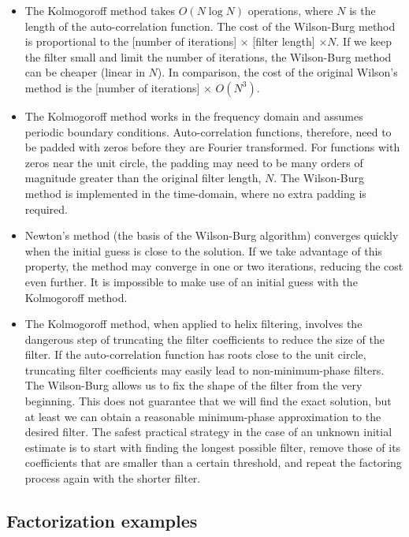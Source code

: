 \begin{itemize}
\item The Kolmogoroff method takes $O(N \log N)$ operations, where $N$ is the
  length of the auto-correlation function.  The cost of the Wilson-Burg method
  is proportional to the [number of iterations] $\times$ [filter length]
  $\times N$.  If we keep the filter small and limit the number of iterations,
  the Wilson-Burg method can be cheaper (linear in $N$). In comparison, the
  cost of the original Wilson's method is the [number of iterations] $\times$
  $O(N^3)$.

\item The Kolmogoroff method works in the frequency domain and assumes
  periodic boundary conditions.  Auto-correlation functions,
  therefore, need to be padded with zeros before they are Fourier
  transformed.  For functions with zeros near the unit circle, the
  padding may need to be many orders of magnitude greater than the
  original filter length, $N$. The Wilson-Burg method is implemented
  in the time-domain, where no extra padding is required.
  
\item Newton's method (the basis of the Wilson-Burg algorithm)
  converges quickly when the initial guess is close to the solution.
  If we take advantage of this property, the method may converge in
  one or two iterations, reducing the cost even further.  It is
  impossible to make use of an initial guess with the Kolmogoroff
  method.
  
\item The Kolmogoroff method, when applied to helix filtering,
  involves the dangerous step of truncating the filter coefficients to
  reduce the size of the filter. If the auto-correlation function has
  roots close to the unit circle, truncating filter coefficients may
  easily lead to non-minimum-phase filters. The Wilson-Burg allows us to
  fix the shape of the filter from the very beginning. This does not
  guarantee that we will find the exact solution, but at least we can
  obtain a reasonable minimum-phase approximation to the desired
  filter. The safest practical strategy in the case of an unknown
  initial estimate is to start with finding the longest possible
  filter, remove those of its coefficients that are smaller than a certain
  threshold, and repeat the factoring process again with the shorter
  filter.
\end{itemize}

\subsection{Factorization examples}

